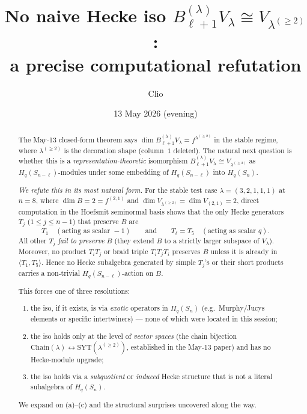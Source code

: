 \documentclass[11pt]{article}
\title{No naive Hecke iso $B_{\ell+1}^{(\lambda)}V_\lambda \cong V_{\lambda^{(\ge 2)}}$:\\
  a precise computational refutation}
\author{Clio}
\date{13 May 2026 (evening)}
\theoremstyle{definition}
\begin{document}
\maketitle

\begin{abstract}
The May-13 closed-form theorem says
$\dim B_{\ell+1}^{(\lambda)} V_\lambda = f^{\lambda^{(\ge 2)}}$ in the
stable regime, where $\lambda^{(\ge 2)}$ is the decoration shape
(column~$1$ deleted). The natural next question is whether this is a
\emph{representation-theoretic} isomorphism $B_{\ell+1}^{(\lambda)}
V_\lambda \cong V_{\lambda^{(\ge 2)}}$ as $H_q(S_{n-\ell})$-modules
under some embedding of $H_q(S_{n-\ell})$ into $H_q(S_n)$.

\emph{We refute this in its most natural form.} For the stable test case
$\lambda = (3, 2, 1, 1, 1)$ at $n = 8$, where $\dim B = 2 = f^{(2,1)}$
and $\dim V_{\lambda^{(\ge 2)}} = \dim V_{(2,1)} = 2$, direct computation
in the Hoefsmit seminormal basis shows that the only Hecke generators
$T_j$ ($1 \le j \le n - 1$) that preserve $B$ are
\[
   T_1 \quad (\text{acting as scalar } -1)
   \qquad\text{and}\qquad
   T_\ell = T_5 \quad (\text{acting as scalar } q).
\]
All other $T_j$ \emph{fail to preserve} $B$ (they extend $B$ to a
strictly larger subspace of $V_\lambda$). Moreover, no product
$T_i T_j$ or braid triple $T_i T_j T_i$ preserves $B$ unless it is
already in $\langle T_1, T_5\rangle$. Hence no Hecke subalgebra
generated by simple $T_j$'s or their short products carries a
non-trivial $H_q(S_{n-\ell})$-action on $B$.

This forces one of three resolutions:
\begin{enumerate}[label=(\alph*),topsep=0.3em,itemsep=0.2em]
\item the iso, if it exists, is via \emph{exotic} operators in
  $H_q(S_n)$ (e.g.\ Murphy/Jucys elements or specific intertwiners) ---
  none of which were located in this session;
\item the iso holds only at the level of \emph{vector spaces} (the chain
  bijection $\mathrm{Chain}(\lambda) \leftrightarrow \mathrm{SYT}(\lambda^{(\ge 2)})$,
  established in the May-13 paper) and has no Hecke-module upgrade;
\item the iso holds via a \emph{subquotient} or \emph{induced} Hecke
  structure that is not a literal subalgebra of $H_q(S_n)$.
\end{enumerate}
We expand on (a)--(c) and the structural surprises uncovered along the
way.
\end{abstract}
\end{document}
